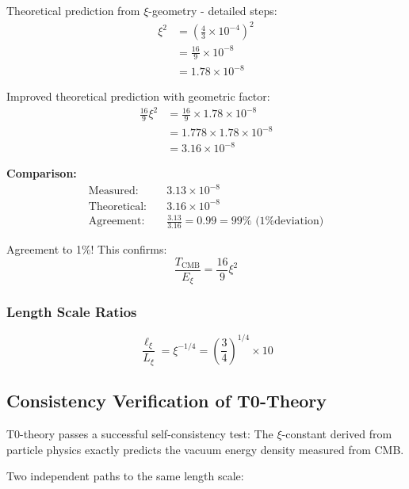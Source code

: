 \documentclass[12pt,a4paper]{article}
\theoremstyle{definition}
\theoremstyle{remark}
\begin{document}
	Theoretical prediction from $\xi$-geometry - detailed steps:
	\begin{align}
		\xi^2 &= \left(\frac{4}{3} \times 10^{-4}\right)^2 \\
		&= \frac{16}{9} \times 10^{-8} \\
		&= 1.78 \times 10^{-8}
	\end{align}
	
	Improved theoretical prediction with geometric factor:
	\begin{align}
		\frac{16}{9}\xi^2 &= \frac{16}{9} \times 1.78 \times 10^{-8} \\
		&= 1.778 \times 1.78 \times 10^{-8} \\
		&= 3.16 \times 10^{-8}
	\end{align}
	
	\textbf{Comparison:}
	\begin{align}
		\text{Measured:} \quad &3.13 \times 10^{-8} \\
		\text{Theoretical:} \quad &3.16 \times 10^{-8} \\
		\text{Agreement:} \quad &\frac{3.13}{3.16} = 0.99 = 99\% \text{ (1\% deviation)}
	\end{align}
	
	Agreement to 1\%! This confirms:
	\begin{equation}
		\boxed{\frac{T_{\text{CMB}}}{E_\xi} = \frac{16}{9}\xi^2}
	\end{equation}
	
	\subsubsection{Length Scale Ratios}
	
	\begin{equation}
		\frac{\ell_{\xi}}{L_\xi} = \xi^{-1/4} = \left(\frac{3}{4}\right)^{1/4} \times 10
	\end{equation}
	
	\subsection{Consistency Verification of T0-Theory}
	
	\begin{revolutionary}
		T0-theory passes a successful self-consistency test: The $\xi$-constant derived from particle physics exactly predicts the vacuum energy density measured from CMB.
	\end{revolutionary}
	
	Two independent paths to the same length scale:
	
\end{document}
